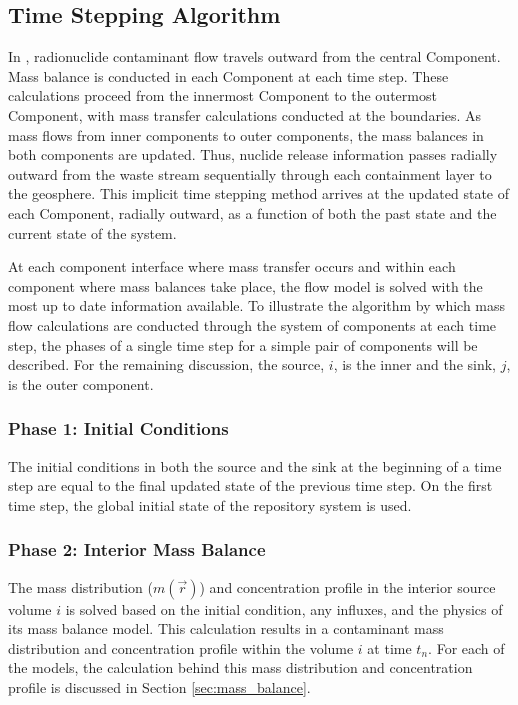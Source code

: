 \subsection{Time Stepping Algorithm}\label{sec:time stepping}

In \Cyder, radionuclide contaminant flow travels outward from the central 
Component. Mass balance is conducted in each Component at each time step. These 
calculations proceed from the innermost Component to the outermost Component, 
with mass transfer calculations conducted at the boundaries. As mass flows from 
inner components to outer components, the mass balances in both components are 
updated.  Thus, nuclide release information passes radially outward from the 
waste stream sequentially through each containment layer to the geosphere.  This 
implicit time stepping method arrives at the updated state of each Component, 
radially outward, as a function of both the past state and the current state of 
the system.  

At each component interface where mass transfer occurs and within each component 
where mass balances take place, the flow model is solved with the most up to 
date information available.  To illustrate the algorithm by which mass flow 
calculations are conducted through the system of components at each time step, 
the phases of a single time step for a simple pair of components will be 
described. For the remaining discussion, the source, $i$, is the inner and the 
sink, $j$, is the outer component. 

\subsubsection{Phase 1: Initial Conditions}

The initial conditions in both the source and the sink at the beginning of a 
time step are equal to the final updated state of the previous time step. On the 
first time step, the global initial state of the repository system is used. 

\subsubsection{Phase 2: Interior Mass Balance}

The mass distribution ($m(\vec{r})$) and concentration profile in the interior source volume 
$i$ is solved based on the initial condition, any influxes, and the physics of 
its mass balance model.  This calculation results in a contaminant mass 
distribution and concentration profile within the volume $i$ at time $t_n$.  
For each of the models, the calculation behind this mass distribution and 
concentration profile is discussed in Section \ref{sec:mass_balance}.

